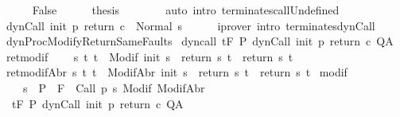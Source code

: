 \begin{isabellebody}
\ \ \ \ \isamarkupfalse%
\ False\isanewline
\ \ \ \ \isamarkupfalse%
\ {\isacharquery}thesis\isanewline
\ \ \ \ \ \ \isamarkupfalse%
\ {\isacharparenleft}auto\ intro{\isacharcolon}\ terminates{\isacharunderscore}callUndefined{\isacharparenright}\isanewline
\ \ \isamarkupfalse%
\isanewline
\ \ \isamarkupfalse%
\ {\isachardoublequoteopen}{\isasymGamma}{\isasymturnstile}dynCall\ init\ p\ return\ c\ {\isasymdown}\ Normal\ s{\isachardoublequoteclose}\isanewline
\ \ \ \ \isamarkupfalse%
\ {\isacharparenleft}iprover\ intro{\isacharcolon}\ terminates{\isacharunderscore}dynCall{\isacharparenright}\isanewline
{}\isamarkupfalse%
%
\endisatagproof
{\isafoldproof}%
%
\isadelimproof
\isanewline
%
\endisadelimproof
\isanewline
{}\isamarkupfalse%
\ dynProcModifyReturnSameFaults{\isacharcolon}\isanewline
{}\ dyn{\isacharunderscore}call{\isacharcolon}\ {\isachardoublequoteopen}{\isasymGamma}{\isacharcomma}{\isasymTheta}{\isasymturnstile}\isactrlsub t\isactrlbsub {\isacharslash}F\isactrlesub \ P\ dynCall\ init\ p\ return{\isacharprime}\ c\ Q{\isacharcomma}A{\isachardoublequoteclose}\isanewline
{}\ ret{\isacharunderscore}modif{\isacharcolon}\isanewline
\ \ \ \ {\isachardoublequoteopen}{\isasymforall}s\ t{\isachardot}\ t\ {\isasymin}\ Modif\ {\isacharparenleft}init\ s{\isacharparenright}\ {\isasymlongrightarrow}\ return{\isacharprime}\ s\ t\ {\isacharequal}\ return\ s\ t{\isachardoublequoteclose}\isanewline
{}\ ret{\isacharunderscore}modifAbr{\isacharcolon}\ {\isachardoublequoteopen}{\isasymforall}s\ t{\isachardot}\ t\ {\isasymin}\ ModifAbr\ {\isacharparenleft}init\ s{\isacharparenright}\ {\isasymlongrightarrow}\ return{\isacharprime}\ s\ t\ {\isacharequal}\ return\ s\ t{\isachardoublequoteclose}\isanewline
{}\ modif{\isacharcolon}\ \isanewline
\ \ \ \ {\isachardoublequoteopen}{\isasymforall}s\ {\isasymin}\ P{\isachardot}\ {\isasymforall}{\isasymsigma}{\isachardot}\ {\isasymGamma}{\isacharcomma}{\isasymTheta}{\isasymturnstile}\isactrlbsub {\isacharslash}F\isactrlesub \ {\isacharbraceleft}{\isasymsigma}{\isacharbraceright}\ Call\ {\isacharparenleft}p\ s{\isacharparenright}\ {\isacharparenleft}Modif\ {\isasymsigma}{\isacharparenright}{\isacharcomma}{\isacharparenleft}ModifAbr\ {\isasymsigma}{\isacharparenright}{\isachardoublequoteclose}\ \isanewline
{}\ {\isachardoublequoteopen}{\isasymGamma}{\isacharcomma}{\isasymTheta}\ {\isasymturnstile}\isactrlsub t\isactrlbsub {\isacharslash}F\isactrlesub \ P\ {\isacharparenleft}dynCall\ init\ p\ return\ c{\isacharparenright}\ Q{\isacharcomma}A{\isachardoublequoteclose}\isanewline

\end{isabellebody}
